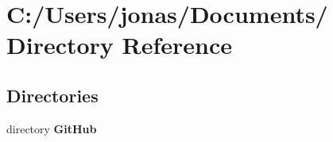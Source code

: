 \section{C:/Users/jonas/Documents/ Directory Reference}
\label{dir_C_3A_2FUsers_2Fjonas_2FDocuments_2F}


\subsection*{Directories}
\begin{CompactItemize}
\item 
directory {\bf Git\-Hub}
\end{CompactItemize}
